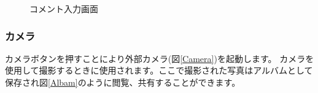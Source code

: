 \documentclass[a4j]{jarticle}
\begin{document}
\begin{figure}[H]
    \begin{center}
    \caption {コメント入力画面}
    \label{Comment}
    \end{center}
\end{figure}

\subsubsection{カメラ}
カメラボタンを押すことにより外部カメラ(図\ref{Camera})を起動します。
カメラを使用して撮影するときに使用されます。ここで撮影された写真はアルバムとして保存され図\ref{Albam}のように閲覧、共有することができます。
\end{document}
